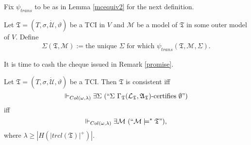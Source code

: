 \documentclass[12pt]{article}
\numberwithin{equation}{section}
\begin{document}
Fix $\psi_{trans}$ to be as in Lemma \ref{mcequiv2} for the next definition. 

\begin{defi}
Let $\mathfrak{T} = (T, \sigma, \dot{\mathcal{U}}, \vartheta)$ be a TCI in $V$ and $\mathcal{M}$ be a model of $\mathfrak{T}$ in some outer model of $V$. Define \begin{align*}
    \Sigma(\mathfrak{T}, \mathcal{M}) := \text{the unique } \Sigma \text{ for which } \psi_{trans}(\mathfrak{T}, \mathcal{M}, \Sigma).
\end{align*}
\end{defi}

It is time to cash the cheque issued in Remark \ref{promise}.

\begin{lem}\label{conalt}
Let $\mathfrak{T} = (T, \sigma, \dot{\mathcal{U}}, \vartheta)$ be a TCI. Then $\mathfrak{T}$ is consistent iff $$\Vdash_{Col(\omega, \lambda)} \exists \Sigma \ (``\Sigma \ \Gamma_{\mathfrak{T}} (\mathcal{L}_{\mathfrak{T}}, \mathfrak{A}_{\mathfrak{T}})\text{-certifies } \emptyset")$$ iff
$$\Vdash_{Col(\omega, \lambda)} \exists \mathcal{M} \ (``\mathcal{M} \models^* \mathfrak{T}"),$$ where $\lambda \geq |H(|trcl(\mathfrak{T})|^+)|$.
\end{lem}
\end{document}
